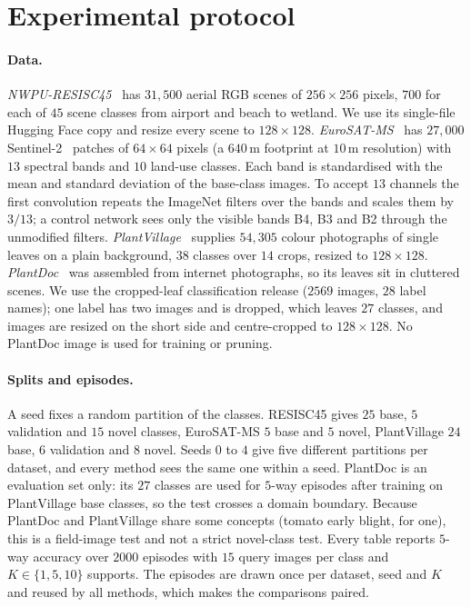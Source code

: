 \section{Experimental protocol}
\label{sec:setup}

\paragraph{Data.}
\emph{NWPU-RESISC45}~\cite{cheng2017resisc} has $31{,}500$ aerial RGB scenes of $256{\times}256$ pixels, $700$ for each of $45$ scene classes from airport and beach to wetland. We use its single-file Hugging Face copy and resize every scene to $128{\times}128$. \emph{EuroSAT-MS}~\cite{helber2019eurosat} has $27{,}000$ Sentinel-2~\cite{drusch2012sentinel2} patches of $64{\times}64$ pixels (a $640$\,m footprint at $10$\,m resolution) with $13$ spectral bands and $10$ land-use classes. Each band is standardised with the mean and standard deviation of the base-class images. To accept $13$ channels the first convolution repeats the ImageNet filters over the bands and scales them by $3/13$; a control network sees only the visible bands B4, B3 and B2 through the unmodified filters. \emph{PlantVillage}~\cite{hughes2015plantvillage} supplies $54{,}305$ colour photographs of single leaves on a plain background, $38$ classes over $14$ crops, resized to $128{\times}128$. \emph{PlantDoc}~\cite{singh2020plantdoc} was assembled from internet photographs, so its leaves sit in cluttered scenes. We use the cropped-leaf classification release ($2569$ images, $28$ label names); one label has two images and is dropped, which leaves $27$ classes, and images are resized on the short side and centre-cropped to $128{\times}128$. No PlantDoc image is used for training or pruning.

\paragraph{Splits and episodes.}
A seed fixes a random partition of the classes. RESISC45 gives $25$ base, $5$ validation and $15$ novel classes, EuroSAT-MS $5$ base and $5$ novel, PlantVillage $24$ base, $6$ validation and $8$ novel. Seeds $0$ to $4$ give five different partitions per dataset, and every method sees the same one within a seed. PlantDoc is an evaluation set only: its $27$ classes are used for $5$-way episodes after training on PlantVillage base classes, so the test crosses a domain boundary. Because PlantDoc and PlantVillage share some concepts (tomato early blight, for one), this is a field-image test and not a strict novel-class test. Every table reports $5$-way accuracy over $2000$ episodes with $15$ query images per class and $K\in\{1,5,10\}$ supports. The episodes are drawn once per dataset, seed and $K$ and reused by all methods, which makes the comparisons paired.

